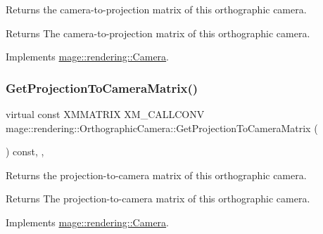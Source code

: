 Returns the camera-\/to-\/projection matrix of this orthographic camera.

\begin{DoxyReturn}{Returns}
The camera-\/to-\/projection matrix of this orthographic camera. 
\end{DoxyReturn}


Implements \mbox{\hyperlink{classmage_1_1rendering_1_1_camera_a08481175c3718a24333b22176e240d44}{mage\+::rendering\+::\+Camera}}.

\mbox{\label{classmage_1_1rendering_1_1_orthographic_camera_a7d52862a3762dcaeadf26e8ae92d9d09}} 
\subsubsection{\texorpdfstring{Get\+Projection\+To\+Camera\+Matrix()}{GetProjectionToCameraMatrix()}}
{\footnotesize\ttfamily virtual const X\+M\+M\+A\+T\+R\+IX X\+M\+\_\+\+C\+A\+L\+L\+C\+O\+NV mage\+::rendering\+::\+Orthographic\+Camera\+::\+Get\+Projection\+To\+Camera\+Matrix (\begin{DoxyParamCaption}{ }\end{DoxyParamCaption}) const\hspace{0.3cm}{\ttfamily [override]}, {\ttfamily [virtual]}, {\ttfamily [noexcept]}}

Returns the projection-\/to-\/camera matrix of this orthographic camera.

\begin{DoxyReturn}{Returns}
The projection-\/to-\/camera matrix of this orthographic camera. 
\end{DoxyReturn}


Implements \mbox{\hyperlink{classmage_1_1rendering_1_1_camera_abb21116f8a6c7513804431d23fa4cf17}{mage\+::rendering\+::\+Camera}}.

\mbox{\label{classmage_1_1rendering_1_1_orthographic_camera_abeb7a7d73f667ed7c9a38e5370bcb5e8}} 
